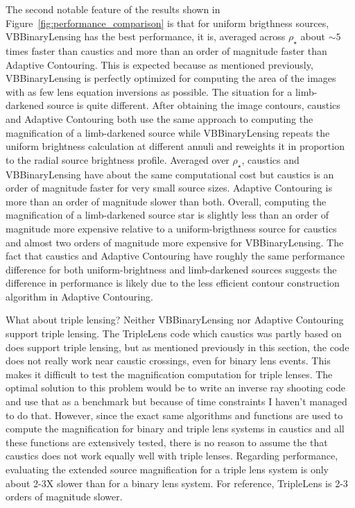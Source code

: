 \documentclass[12pt,dvipsnames]{report}
\newcommand{\ssf}[1]{\textsf{#1}}
\begin{document}
The second notable feature of the results shown in Figure~\ref{fig:performance_comparison}
is that for uniform brigthness sources, \ssf{VBBinaryLensing} has the best performance, 
it is, averaged across $\rho_\star$ about $\sim 5$ times faster than \ssf{caustics} and 
more than an order of magnitude faster than \ssf{Adaptive Contouring}. This is expected
because as mentioned previously, \ssf{VBBinaryLensing} is perfectly optimized for 
computing the area of the images with as few lens equation inversions as possible. 
The situation for a limb-darkened source is quite different. After obtaining the 
image contours, \ssf{caustics} and \ssf{Adaptive Contouring} both use the same approach 
to computing the magnification of a limb-darkened source while \ssf{VBBinaryLensing} repeats
the uniform brightness calculation at different annuli and reweights it in proportion to 
the radial source brightness profile. Averaged over $\rho_\star$, \ssf{caustics} and 
\ssf{VBBinaryLensing} have about the same computational cost but \ssf{caustics} is an order 
of magnitude faster for very small source sizes. \ssf{Adaptive Contouring} is more than an 
order of magnitude slower than both. Overall, computing the magnification of a limb-darkened 
source star is slightly less than an order of magnitude more expensive relative to 
a uniform-brigthness source for \ssf{caustics} and almost two orders of magnitude more 
expensive for \ssf{VBBinaryLensing}. 
The fact that \ssf{caustics} and \ssf{Adaptive Contouring} have roughly the same performance 
difference for both uniform-brightness and limb-darkened sources suggests the difference 
in performance is likely due to the less efficient contour construction algorithm  in 
\ssf{Adaptive Contouring}.

What about triple lensing? Neither \ssf{VBBinaryLensing} nor \ssf{Adaptive Contouring} 
support triple lensing. The \ssf{TripleLens} code \citep{2021MNRAS.503.6143K} which 
\ssf{caustics} was partly based on does support triple 
lensing, but as mentioned previously in this section, the code does not really work
near \ssf{caustic} crossings, even for binary lens events. 
This makes it difficult to test the magnification computation for triple lenses. The 
optimal solution to this problem would be to write an inverse ray shooting code and use that
as a benchmark but because of time constraints I haven't managed to do that. 
However, since the exact same algorithms and functions are 
used to compute the magnification for binary and triple lens systems in \ssf{caustics} 
and all these functions are extensively tested, there is no reason to assume the that 
\ssf{caustics} does not work equally well with triple lenses. 
Regarding performance, evaluating the extended source magnification for a triple lens system 
is only about 2-3X slower than for a binary lens system. For reference, 
\ssf{TripleLens} is 2-3 orders of magnitude slower.
\end{document}
